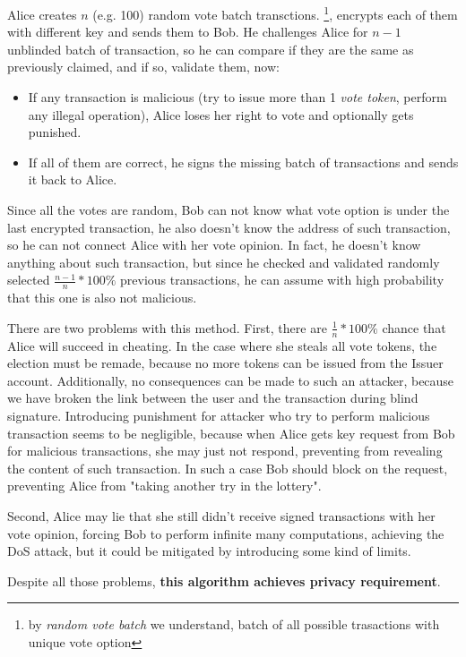 \documentclass[runningheads]{llncs}
\begin{document}
Alice creates \(n\) (e.g. 100) random vote batch transctions. \footnote{by \textit{random vote batch} we understand, batch of all possible trasactions with unique vote option}, encrypts each of them with different key and sends them to Bob. He challenges Alice for \(n-1\) unblinded batch of transaction, so he can compare if they are the same as previously claimed, and if so, validate them, now: 
\begin{itemize}
 \item If any transaction is malicious (try to issue more than 1 \textit{vote token}, perform any illegal operation), Alice loses her right to vote and optionally gets punished.

 \item If all of them are correct, he signs the missing batch of transactions and sends it back to Alice.
\end{itemize}
Since all the votes are random, Bob can not know what vote option is under the last encrypted transaction, he also doesn't know the address of such transaction, so he can not connect Alice with her vote opinion. In fact, he doesn't know anything about such transaction, but since he checked and validated randomly selected \(\frac{n-1}{n}*100\%\) previous transactions, he can assume with high probability that this one is also not malicious.

There are two problems with this method.
First, there are \(\frac{1}{n}*100\%\) chance that Alice will succeed in cheating. In the case where she steals all vote tokens, the election must be remade, because no more tokens can be issued from the Issuer account. Additionally, no consequences can be made to such an attacker, because we have broken the link between the user and the transaction during blind signature. Introducing punishment for attacker who try to perform malicious transaction seems to be negligible, because when Alice gets key request from Bob for malicious transactions, she may just not respond, preventing from revealing the content of such transaction. In such a case Bob should block on the request, preventing Alice from "taking another try in the lottery".

Second, Alice may lie that she still didn't receive signed transactions with her vote opinion, forcing Bob to perform infinite many computations, achieving the DoS attack, but it could be mitigated by introducing some kind of limits.

Despite all those problems, \textbf{this algorithm achieves privacy requirement}.
\end{document}
